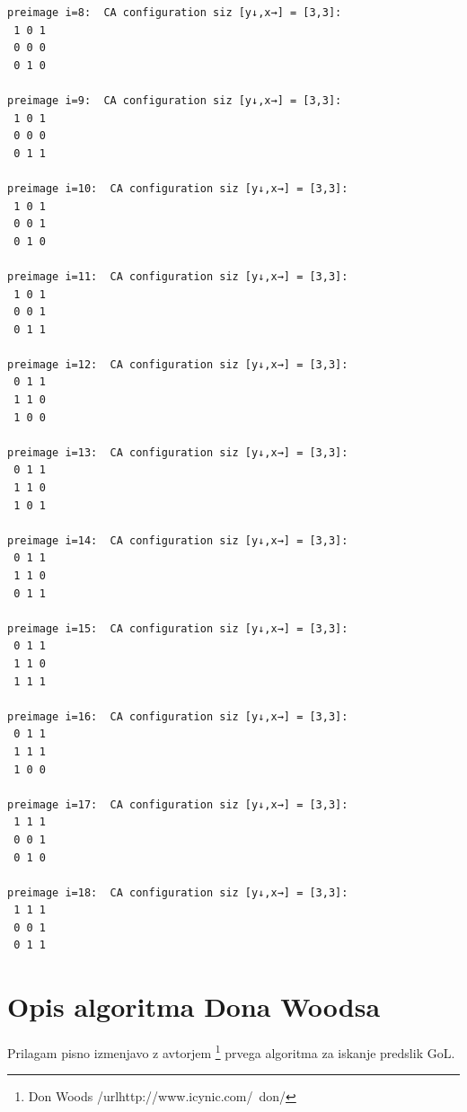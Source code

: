 \documentclass[12pt,a4paper,openany,twoside]{book}
\begin{document}
\begin{verbatim}
preimage i=8:  CA configuration siz [y↓,x→] = [3,3]:
 1 0 1
 0 0 0
 0 1 0

preimage i=9:  CA configuration siz [y↓,x→] = [3,3]:
 1 0 1
 0 0 0
 0 1 1

preimage i=10:  CA configuration siz [y↓,x→] = [3,3]:
 1 0 1
 0 0 1
 0 1 0

preimage i=11:  CA configuration siz [y↓,x→] = [3,3]:
 1 0 1
 0 0 1
 0 1 1

preimage i=12:  CA configuration siz [y↓,x→] = [3,3]:
 0 1 1
 1 1 0
 1 0 0

preimage i=13:  CA configuration siz [y↓,x→] = [3,3]:
 0 1 1
 1 1 0
 1 0 1

preimage i=14:  CA configuration siz [y↓,x→] = [3,3]:
 0 1 1
 1 1 0
 0 1 1

preimage i=15:  CA configuration siz [y↓,x→] = [3,3]:
 0 1 1
 1 1 0
 1 1 1

preimage i=16:  CA configuration siz [y↓,x→] = [3,3]:
 0 1 1
 1 1 1
 1 0 0

preimage i=17:  CA configuration siz [y↓,x→] = [3,3]:
 1 1 1
 0 0 1
 0 1 0

preimage i=18:  CA configuration siz [y↓,x→] = [3,3]:
 1 1 1
 0 0 1
 0 1 1
\end{verbatim}


\chapter{Opis algoritma Dona Woodsa}

Prilagam pisno izmenjavo z avtorjem \footnote{Don Woods /url{http://www.icynic.com/~don/}} prvega algoritma za iskanje predslik GoL.
\end{document}
